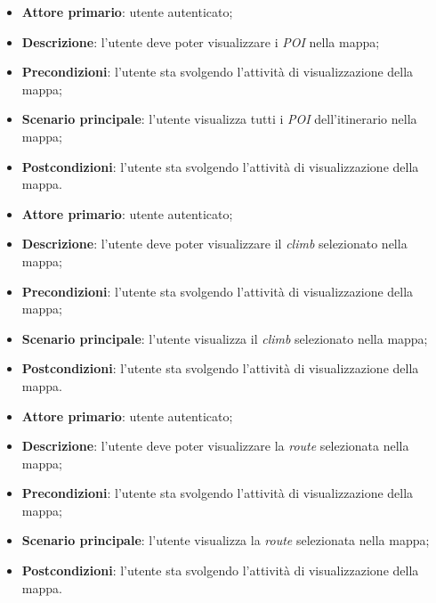 \label{uc:vis_poi_map_day}
\begin{itemize}
	\item \textbf{Attore primario}: utente autenticato;
	\item \textbf{Descrizione}: l'utente deve poter visualizzare i \textit{POI} nella mappa;
	\item \textbf{Precondizioni}: l'utente sta svolgendo l'attività di visualizzazione della mappa;
	\item \textbf{Scenario principale}: l'utente visualizza tutti i \textit{POI} dell'itinerario nella mappa;
	\item \textbf{Postcondizioni}: l'utente sta svolgendo l'attività di visualizzazione della mappa.
\end{itemize}

\label{uc:vis_climb_sel}
\begin{itemize}
	\item \textbf{Attore primario}: utente autenticato;
	\item \textbf{Descrizione}: l'utente deve poter visualizzare il \textit{climb} selezionato nella mappa;
	\item \textbf{Precondizioni}: l'utente sta svolgendo l'attività di visualizzazione della mappa;
	\item \textbf{Scenario principale}: l'utente visualizza il \textit{climb} selezionato nella mappa;
	\item \textbf{Postcondizioni}: l'utente sta svolgendo l'attività di visualizzazione della mappa.
\end{itemize}

\label{uc:vis_route_sel}
\begin{itemize}
	\item \textbf{Attore primario}: utente autenticato;
	\item \textbf{Descrizione}: l'utente deve poter visualizzare la \textit{route} selezionata nella mappa;
	\item \textbf{Precondizioni}: l'utente sta svolgendo l'attività di visualizzazione della mappa;
	\item \textbf{Scenario principale}: l'utente visualizza la \textit{route} selezionata nella mappa;
	\item \textbf{Postcondizioni}: l'utente sta svolgendo l'attività di visualizzazione della mappa.
\end{itemize}

